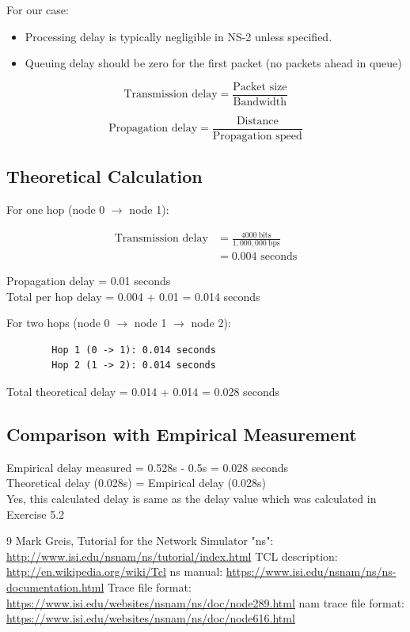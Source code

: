\documentclass[12pt]{article}
\begin{document}
	\noindent
	For our case:
	\begin{itemize}
		\item Processing delay is typically negligible in NS-2 unless specified.
		\item Queuing delay should be zero for the first packet (no packets ahead in queue)
	\end{itemize}
	
	\begin{equation*}
		\text{Transmission delay} = \frac{\text{Packet size}}{\text{Bandwidth}}
	\end{equation*}

	\begin{equation*}
		\text{Propagation delay} = \frac{\text{Distance}}{\text{Propagation speed}}
	\end{equation*}
	
	
	\subsection{Theoretical Calculation}
	For one hop (node 0 $\rightarrow$ node 1):
	
	\begin{align*}
		\text{Transmission delay} &= \frac{4000~\mathrm{bits}}{1,000,000~\mathrm{bps}} \\
		&= 0.004 \text{ seconds}
	\end{align*}
	
	\noindent
	Propagation delay = 0.01 seconds \\
	Total per hop delay = 0.004 + 0.01 = 0.014 seconds
	
	\noindent
	\newline
	For two hops (node 0 $\rightarrow$ node 1 $\rightarrow$ node 2):
	
	\begin{verbatim}
		Hop 1 (0 -> 1): 0.014 seconds
		Hop 2 (1 -> 2): 0.014 seconds
	\end{verbatim}
	
	\noindent
	Total theoretical delay = 0.014 + 0.014 = 0.028 seconds
	
	\subsection{Comparison with Empirical Measurement}
	Empirical delay measured = 0.528s - 0.5s = 0.028 seconds \\
	Theoretical delay (0.028s) = Empirical delay (0.028s) \\
	Yes, this calculated delay is same as the delay value which was calculated in Exercise 5.2

	\begin{thebibliography}{9}
		 Mark Greis, Tutorial for the Network Simulator "ns": \url{http://www.isi.edu/nsnam/ns/tutorial/index.html}
		 TCL description: \url{http://en.wikipedia.org/wiki/Tcl}
		 ns manual: \url{https://www.isi.edu/nsnam/ns/ns-documentation.html}
		 Trace file format: \url{https://www.isi.edu/websites/nsnam/ns/doc/node289.html}
		 nam trace file format: \url{https://www.isi.edu/websites/nsnam/ns/doc/node616.html}
	\end{thebibliography}
\end{document}
